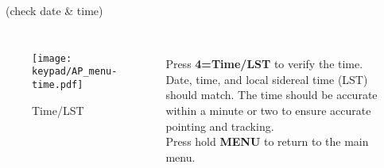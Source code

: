 \begin{frame}[t]{\insertsubsectionhead\ (check date \& time)}
    \begin{columns}[T]
      \begin{figure}[h]
          \texttt{[image: keypad/AP\_menu-time.pdf]}
        \caption{Time/LST}
      \end{figure}
    \large
    \ \\[0.25ex]
    Press \textbf{4=Time/LST} to verify the time.\\[1ex]

    Date, time, and local sidereal time (LST) should match. The time should be
    accurate within a minute or two to ensure accurate pointing and tracking.\\[1ex]

    Press hold \textbf{MENU} to return to the main menu.
  \end{columns}
\end{frame}

